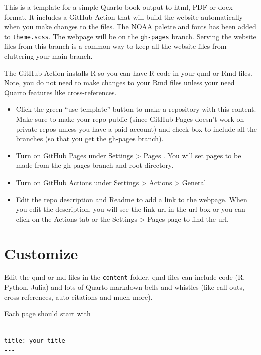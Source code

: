 \documentclass[
  letterpaper,
  oneside,
  open=any]{scrbook}
\begin{document}
This is a template for a simple Quarto book output to html, PDF or docx
format. It includes a GitHub Action that will build the website
automatically when you make changes to the files. The NOAA palette and
fonts has been added to \texttt{theme.scss}. The webpage will be on the
\texttt{gh-pages} branch. Serving the website files from this branch is
a common way to keep all the website files from cluttering your main
branch.

The GitHub Action installs R so you can have R code in your qmd or Rmd
files. Note, you do not need to make changes to your Rmd files unless
your need Quarto features like cross-references.

\begin{itemize}
\item
  Click the green ``use template'' button to make a repository with this
  content. Make sure to make your repo public (since GitHub Pages
  doesn't work on private repos unless you have a paid account) and
  check box to include all the branches (so that you get the gh-pages
  branch).
\item
  Turn on GitHub Pages under Settings \textgreater{} Pages . You will
  set pages to be made from the gh-pages branch and root directory.
\item
  Turn on GitHub Actions under Settings \textgreater{} Actions
  \textgreater{} General
\item
  Edit the repo description and Readme to add a link to the webpage.
  When you edit the description, you will see the link url in the url
  box or you can click on the Actions tab or the Settings \textgreater{}
  Pages page to find the url.
\end{itemize}


\hypertarget{customize}{%
\chapter{Customize}\label{customize}}

Edit the qmd or md files in the \texttt{content} folder. qmd files can
include code (R, Python, Julia) and lots of Quarto markdown bells and
whistles (like call-outs, cross-references, auto-citations and much
more).

Each page should start with

\begin{verbatim}
---
title: your title
---
\end{verbatim}
\end{document}
